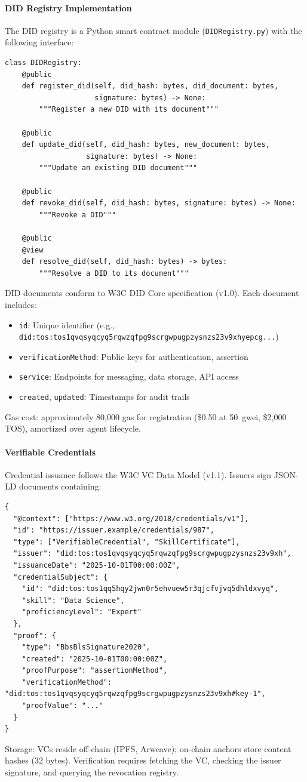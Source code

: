 \documentclass[11pt]{article}
\begin{document}
\paragraph{DID Registry Implementation} The DID registry is a Python smart contract module (\texttt{DIDRegistry.py}) with the following interface:
\begin{verbatim}
class DIDRegistry:
    @public
    def register_did(self, did_hash: bytes, did_document: bytes,
                     signature: bytes) -> None:
        """Register a new DID with its document"""

    @public
    def update_did(self, did_hash: bytes, new_document: bytes,
                   signature: bytes) -> None:
        """Update an existing DID document"""

    @public
    def revoke_did(self, did_hash: bytes, signature: bytes) -> None:
        """Revoke a DID"""

    @public
    @view
    def resolve_did(self, did_hash: bytes) -> bytes:
        """Resolve a DID to its document"""
\end{verbatim}
DID documents conform to W3C DID Core specification (v1.0). Each document includes:
\begin{itemize}[noitemsep]
  \item \texttt{id}: Unique identifier (e.g., \texttt{did:tos:tos1qvqsyqcyq5rqwzqfpg9scrgwpugpzysnzs23v9xhyepcg...})
  \item \texttt{verificationMethod}: Public keys for authentication, assertion
  \item \texttt{service}: Endpoints for messaging, data storage, API access
  \item \texttt{created}, \texttt{updated}: Timestamps for audit trails
\end{itemize}
Gas cost: approximately 80,000 gas for registration (\$0.50 at 50~gwei, \$2,000 TOS), amortized over agent lifecycle.

\paragraph{Verifiable Credentials} Credential issuance follows the W3C VC Data Model (v1.1). Issuers sign JSON-LD documents containing:
\begin{verbatim}
{
  "@context": ["https://www.w3.org/2018/credentials/v1"],
  "id": "https://issuer.example/credentials/987",
  "type": ["VerifiableCredential", "SkillCertificate"],
  "issuer": "did:tos:tos1qvqsyqcyq5rqwzqfpg9scrgwpugpzysnzs23v9xh",
  "issuanceDate": "2025-10-01T00:00:00Z",
  "credentialSubject": {
    "id": "did:tos:tos1qq5hqy2jwn0r5ehvuew5r3qjcfvjvq5dhldxvyq",
    "skill": "Data Science",
    "proficiencyLevel": "Expert"
  },
  "proof": {
    "type": "BbsBlsSignature2020",
    "created": "2025-10-01T00:00:00Z",
    "proofPurpose": "assertionMethod",
    "verificationMethod": "did:tos:tos1qvqsyqcyq5rqwzqfpg9scrgwpugpzysnzs23v9xh#key-1",
    "proofValue": "..."
  }
}
\end{verbatim}
Storage: VCs reside off-chain (IPFS, Arweave); on-chain anchors store content hashes (32 bytes). Verification requires fetching the VC, checking the issuer signature, and querying the revocation registry.
\end{document}
